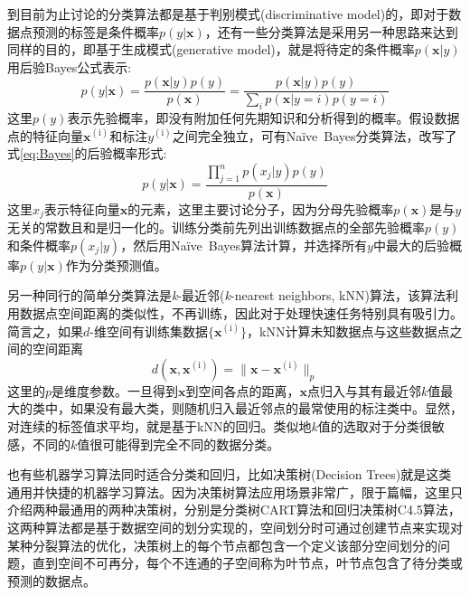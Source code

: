 到目前为止讨论的分类算法都是基于判别模式\textrm{(discriminative model)}的，即对于数据点预测的标签是条件概率$p(y|\mathbf{x})$，还有一些分类算法是采用另一种思路来达到同样的目的，即基于生成模式\textrm{(generative model)}，就是将待定的条件概率$p(\mathbf{x}|y)$用后验\textrm{Bayes}公式表示:
\begin{equation}
	p(y|\mathbf{x})=\dfrac{p(\mathbf{x}|y)p(y)}{p(\mathbf{x})}=\dfrac{p(\mathbf{x}|y)p(y)}{\sum\limits_ip(\mathbf{x}|y=i)p(y=i)}
	\label{eq:Bayes}
\end{equation}
这里$p(y)$表示先验概率，即没有附加任何先期知识和分析得到的概率。假设数据点的特征向量$\mathbf{x}^{(\mathrm{i})}$和标注$y^{(\mathrm{i})}$之间完全独立，可有\textrm{Na\"ive~Bayes}分类算法\cite{Naive-Bayes}，改写了式\eqref{eq:Bayes}的后验概率形式:
\begin{equation}
	p(y|\mathbf{x})=\dfrac{\prod\limits_{j=1}^np(x_j|y)p(y)}{p(\mathbf{x})}
	\label{eq:Naive-Bayes}
\end{equation}
这里$x_j$表示特征向量$\mathbf{x}$的元素，这里主要讨论分子，因为分母先验概率$p(\mathbf{x})$是与$y$无关的常数且和是归一化的。训练分类前先列出训练数据点的全部先验概率$p(y)$和条件概率$p(x_j|y)$，然后用\textrm{Na\"ive~Bayes}算法计算，并选择所有$y$中最大的后验概率$p(y|\mathbf{x})$作为分类预测值。

另一种同行的简单分类算法是\textit{k}-最近邻(\textit{k}-\textrm{nearest neighbors, kNN})算法，该算法利用数据点空间距离的类似性，不再训练，因此对于处理快速任务特别具有吸引力。简言之，如果$d$-维空间有训练集数据$\{\mathbf{x}^{(\mathrm{i})}\}$，\textrm{kNN}计算未知数据点与这些数据点之间的空间距离
\begin{displaymath}
	d(\mathbf{x},\mathbf{x}^{(\mathrm{i})})=\|\mathbf{x}-\mathbf{x}^{(\mathrm{i})}\|_p
\end{displaymath}
这里的$p$是维度参数。一旦得到$\mathbf{x}$到空间各点的距离，$\mathbf{x}$点归入与其有最近邻$k$值最大的类中，如果没有最大类，则随机归入最近邻点的最常使用的标注类中。显然，对连续的标签值求平均，就是基于\textrm{kNN}的回归。类似地$k$值的选取对于分类很敏感，不同的$k$值很可能得到完全不同的数据分类。

也有些机器学习算法同时适合分类和回归，比如决策树\textrm{(Decision Trees)}就是这类通用并快捷的机器学习算法。因为决策树算法应用场景非常广，限于篇幅，这里只介绍两种最通用的两种决策树，分别是分类树\textrm{CART}算法\cite{ML_CART}和回归决策树\textrm{C4.5}算法\cite{ML_C4.5}，这两种算法都是基于数据空间的划分实现的，空间划分时可通过创建节点来实现对某种分裂算法的优化，决策树上的每个节点都包含一个定义该部分空间划分的问题，直到空间不可再分，每个不连通的子空间称为叶节点，叶节点包含了待分类或预测的数据点。

